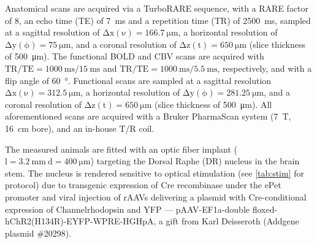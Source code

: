 Anatomical scans are acquired via a TurboRARE sequence, with a RARE factor of 8, an echo time (TE) of \SI{7}{\milli\second} and a repetition time (TR) of \SI{2500}{\milli\second}, sampled at a sagittal resolution of $\mathrm{\Delta x(\nu)=\SI{166.7}{\micro\meter}}$, a horizontal resolution of $\mathrm{\Delta y(\phi)=\SI{75}{\micro\meter}}$, and a coronal resolution of $\mathrm{\Delta z(t)=\SI{650}{\micro\meter}}$ (slice thickness of \SI{500}{\micro\meter}).
The functional BOLD and CBV scans are acquired with $\mathrm{TR/TE = \SI{1000}{\milli\second}/\SI{15}{\milli\second}}$ and $\mathrm{TR/TE = \SI{1000}{\milli\second}/\SI{5.5}{\milli\second}}$, respectively, and with a flip angle of \SI{60}{\degree}.
Functional scans are sampled at a sagittal resolution $\mathrm{\Delta x(\nu)=\SI{312.5}{\micro\meter}}$, a horizontal resolution of $\mathrm{\Delta y(\phi)=\SI{281.25}{\micro\meter}}$, and a coronal resolution of $\mathrm{\Delta z(t)=\SI{650}{\micro\meter}}$ (slice thickness of \SI{500}{\micro\meter}).
All aforementioned scans are acquired with a Bruker PharmaScan system (\SI{7}{\tesla}, \SI{16}{\centi\meter} bore), and an in-house T/R coil.

The measured animals are fitted with an optic fiber implant ($\mathrm{l=\SI{3.2}{\milli\meter} \ d=\SI{400}{\micro\meter}}$) targeting the Dorsal Raphe (DR) nucleus in the brain stem.
The nucleus is rendered sensitive to optical stimulation (see \cref{tab:stim} for protocol) due to transgenic expression of Cre recombinase under the ePet promoter \cite{Scott2005} and viral injection of rAAVs delivering a plasmid with Cre-conditional expression of Channelrhodopsin and YFP ---
pAAV-EF1a-double floxed-hChR2(H134R)-EYFP-WPRE-HGHpA, a gift from Karl Deisseroth (Addgene plasmid \#20298).
